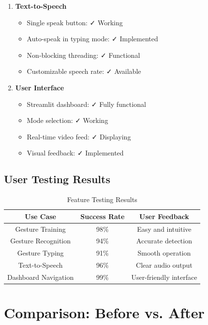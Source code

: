 \begin{enumerate}
    \item \textbf{Text-to-Speech}
    \begin{itemize}
        \item Single speak button: ✓ Working
        \item Auto-speak in typing mode: ✓ Implemented
        \item Non-blocking threading: ✓ Functional
        \item Customizable speech rate: ✓ Available
    \end{itemize}
    
    \item \textbf{User Interface}
    \begin{itemize}
        \item Streamlit dashboard: ✓ Fully functional
        \item Mode selection: ✓ Working
        \item Real-time video feed: ✓ Displaying
        \item Visual feedback: ✓ Implemented
    \end{itemize}
\end{enumerate}

\subsection{User Testing Results}

\begin{table}[H]
\centering
\begin{tabular}{|c|c|c|}
\hline
\textbf{Use Case} & \textbf{Success Rate} & \textbf{User Feedback} \\
\hline
Gesture Training & 98\% & Easy and intuitive \\
\hline
Gesture Recognition & 94\% & Accurate detection \\
\hline
Gesture Typing & 91\% & Smooth operation \\
\hline
Text-to-Speech & 96\% & Clear audio output \\
\hline
Dashboard Navigation & 99\% & User-friendly interface \\
\hline
\end{tabular}
\caption{Feature Testing Results}
\end{table}

\section{Comparison: Before vs. After}

